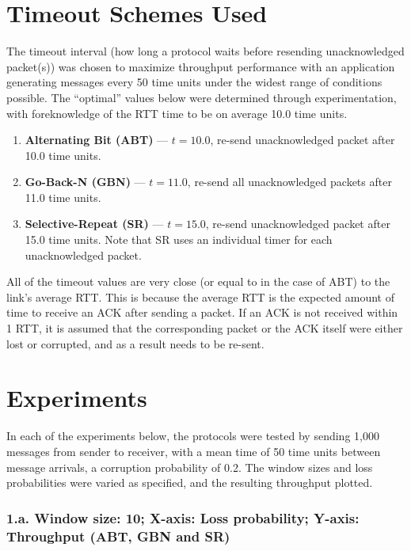 \documentclass{article}
\begin{document}
\pagebreak

\section{Timeout Schemes Used}
The timeout interval (how long a protocol waits before resending unacknowledged packet(s)) was chosen to maximize throughput performance with an application generating messages every 50 time units under the widest range of conditions possible. The ``optimal'' values below were determined through experimentation, with foreknowledge of the RTT time to be on average 10.0 time units. 

\begin{enumerate}
    \item \textbf{Alternating Bit (ABT)} --- $t=10.0$, re-send unacknowledged packet after 10.0 time units.
    \item \textbf{Go-Back-N (GBN)} --- $t=11.0$, re-send all unacknowledged packets after 11.0 time units.
    \item \textbf{Selective-Repeat (SR)} --- $t=15.0$, re-send unacknowledged packet after 15.0 time units. Note that SR uses an individual timer for each unacknowledged packet.
\end{enumerate}

All of the timeout values are very close (or equal to in the case of ABT) to the link's average RTT. This is because the average RTT is the expected amount of time to receive an ACK after sending a packet. If an ACK is not received within 1 RTT, it is assumed that the corresponding packet or the ACK itself were either lost or corrupted, and as a result needs to be re-sent.

\pagebreak

\section{Experiments}

In each of the experiments below, the protocols were tested by sending 1,000 messages from sender to receiver, with a mean time of 50 time units between message arrivals, a corruption probability of 0.2. The window sizes and loss probabilities were varied as specified, and the resulting throughput plotted.

\subsubsection{1.a. Window size: 10; X-axis: Loss probability; Y-axis: Throughput (ABT, GBN and SR)}
\end{document}
